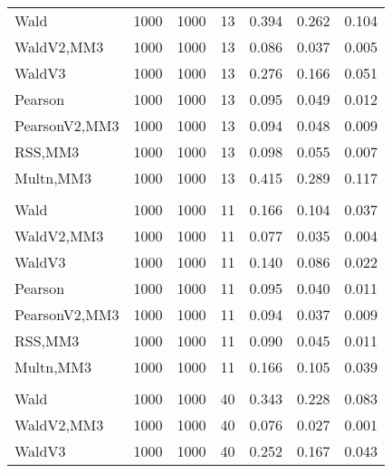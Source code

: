\documentclass[
]{article}
\begin{document}
\begin{table}[H]
{\begin{tabular}[t]{lrrrrrr}
\hspace{1em}Wald & 1000 & 1000 & 13 & 0.394 & 0.262 & 0.104\\
\hspace{1em}WaldV2,MM3 & 1000 & 1000 & 13 & 0.086 & 0.037 & 0.005\\
\hspace{1em}WaldV3 & 1000 & 1000 & 13 & 0.276 & 0.166 & 0.051\\
\hspace{1em}Pearson & 1000 & 1000 & 13 & 0.095 & 0.049 & 0.012\\
\hspace{1em}PearsonV2,MM3 & 1000 & 1000 & 13 & 0.094 & 0.048 & 0.009\\
\hspace{1em}RSS,MM3 & 1000 & 1000 & 13 & 0.098 & 0.055 & 0.007\\
\hspace{1em}Multn,MM3 & 1000 & 1000 & 13 & 0.415 & 0.289 & 0.117\\
\addlinespace[0.3em]
\multicolumn{7}{l}{\textbf{2F 10V}}\\
\hspace{1em}Wald & 1000 & 1000 & 11 & 0.166 & 0.104 & 0.037\\
\hspace{1em}WaldV2,MM3 & 1000 & 1000 & 11 & 0.077 & 0.035 & 0.004\\
\hspace{1em}WaldV3 & 1000 & 1000 & 11 & 0.140 & 0.086 & 0.022\\
\hspace{1em}Pearson & 1000 & 1000 & 11 & 0.095 & 0.040 & 0.011\\
\hspace{1em}PearsonV2,MM3 & 1000 & 1000 & 11 & 0.094 & 0.037 & 0.009\\
\hspace{1em}RSS,MM3 & 1000 & 1000 & 11 & 0.090 & 0.045 & 0.011\\
\hspace{1em}Multn,MM3 & 1000 & 1000 & 11 & 0.166 & 0.105 & 0.039\\
\addlinespace[0.3em]
\multicolumn{7}{l}{\textbf{3F 15V}}\\
\hspace{1em}Wald & 1000 & 1000 & 40 & 0.343 & 0.228 & 0.083\\
\hspace{1em}WaldV2,MM3 & 1000 & 1000 & 40 & 0.076 & 0.027 & 0.001\\
\hspace{1em}WaldV3 & 1000 & 1000 & 40 & 0.252 & 0.167 & 0.043\\

\end{tabular}}
\end{table}
\end{document}
